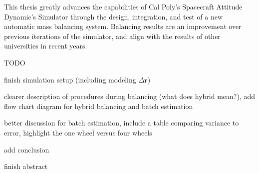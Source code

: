 This thesis greatly advances the capabilities of Cal Poly's 
Spacecraft Attitude Dynamic's Simulator through the design,
integration, and test of a new automatic mass balancing system.
Balancing results are  an improvement over previous iterations 
of the simulator, and align with the results of other universities
in recent years.

TODO

finish simulation setup (including modeling $\Delta\bm{r}$)

clearer description of procedures during balancing (what does hybrid mean?), add flow chart diagram for hybrid balancing and batch estimation

better discussion for batch estimation, include a table comparing variance to error, highlight the one wheel versus four wheels

add conclusion

finish abstract